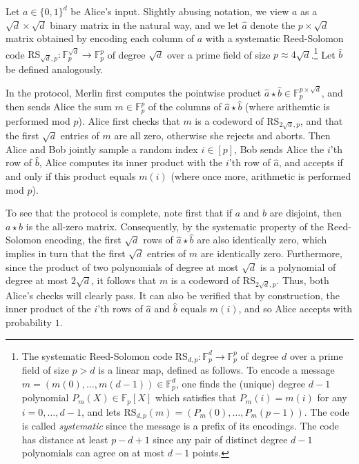 \documentclass[11pt]{article}
\theoremstyle{plain}
\theoremstyle{remark}
\newcommand{\F}{\mathbb{F}}
\begin{document}
Let $a \in\{0,1\}^{d}$ be Alice's input. 
Slightly abusing notation, we view $a$ as a $\sqrt{d} \times \sqrt{d}$ binary matrix in the natural way, and we let $\hat a$ denote the $p \times \sqrt{d}$ matrix obtained by encoding each column of $a$ with a systematic Reed-Solomon code $\mathrm{RS}_{\sqrt{d}, p} : \F_p^{\sqrt{d}} \to \F_p^{p}$ of degree $\sqrt{d}$ over a prime field of size $p \approx 4\sqrt{d}$.\footnote{The systematic Reed-Solomon code $\mathrm{RS}_{d,p}: \F_p^d \to \F_p^p$ of degree $d$ over a prime field of size $p>d$ is a linear map, defined as follows. To encode a message $m = (m(0),\ldots, m(d-1))  \in \F_p^d$, one finds the (unique) degree $d-1$ polynomial $P_m(X) \in \F_p[X]$ which satisfies that $P_m(i) = m(i)$ for any $i = 0, \ldots , d-1$, and lets $\mathrm{RS}_{d,p}(m)= (P_m(0), \ldots, P_m(p-1))$. The code is called \emph{systematic} since the message is a prefix of its encodings.
The code has distance at least $p-d+1$ since any pair of distinct degree $d-1$ polynomials can agree on at most $d-1$ points. }
 Let $\hat b$ be defined analogously.

In the protocol, Merlin first computes the pointwise product $\hat a \star \hat b \in \F_p^{p\times \sqrt{d}}$, and then sends Alice the sum $m \in \F_p^p$ of the columns of $\hat a \star \hat b$ (where arithemtic is performed mod $p$). Alice first checks that $m$ is a codeword of $\mathrm{RS}_{2\sqrt{d},p}$, and that the first $\sqrt{d}$ entries of $m$ are all zero, otherwise she rejects and aborts.
Then Alice and Bob jointly sample a random index $i \in [p]$, Bob sends Alice the $i$'th row of $\hat b$, Alice computes its inner product with the $i$'th row of $\hat a$, and accepts if and only if this product equals $m(i)$ (where once more, arithmetic is performed mod $p$).
 
 To see that the protocol is complete, note first that if $a$ and $b$ are disjoint, then $a \star b$ is the all-zero matrix. Consequently, by the systematic property of the Reed-Solomon encoding, the first $\sqrt{d}$ rows of $\hat a \star \hat b$ are also identically zero, which implies in turn that the first $\sqrt{d}$ entries of $m$ are identically zero. Furthermore, since the product of
two polynomials of degree at most $\sqrt{d}$ is a polynomial of degree at most $2 \sqrt{d}$, it follows that $m$ is a codeword of $\mathrm{RS}_{2\sqrt{d},p}$. Thus, both Alice's checks will clearly pass. It can also be verified that by construction, the inner product of the $i$'th rows of $\hat a$ and $\hat b$ equals $m(i)$, and so Alice accepts with probability $1$.
\end{document}
